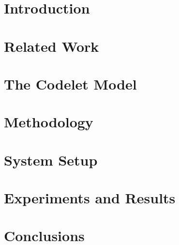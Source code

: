 \documentclass[runningheads]{llncs}
\begin{document}
\section{Introduction}
\label{sec:intro}


\section{Related Work}
\label{sec:related}


\section{The Codelet Model}
\label{sec:model}


\section{Methodology}
\label{sec:method}


\section{System Setup}
\label{sec:system}


\section{Experiments and Results}
\label{sec:results}


\section{Conclusions}
\label{sec:conclusions}


{\footnotesize \large

}
\end{document}
